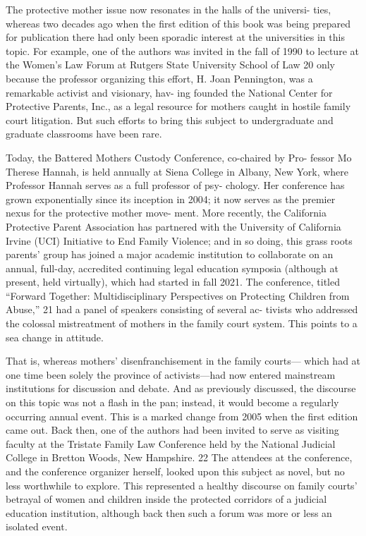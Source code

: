 
The protective mother issue now resonates in the halls of the universi-
ties, whereas two decades ago when the first edition of this book was
being prepared for publication there had only been sporadic interest at
the universities in this topic. For example, one of the authors was invited
in the fall of 1990 to lecture at the Women’s Law Forum at Rutgers State
University School of Law 20 only because the professor organizing this
effort, H. Joan Pennington, was a remarkable activist and visionary, hav-
ing founded the National Center for Protective Parents, Inc., as a legal
resource for mothers caught in hostile family court litigation. But such
efforts to bring this subject to undergraduate and graduate classrooms
have been rare. \pfl{}


Today, the Battered Mothers Custody Conference, co-chaired by Pro-
fessor Mo Therese Hannah, is held annually at Siena College in Albany,
New York, where Professor Hannah serves as a full professor of psy-
chology. Her conference has grown exponentially since its inception in
2004; it now serves as the premier nexus for the protective mother move-
ment. More recently, the California Protective Parent Association has
partnered with the University of California Irvine (UCI) Initiative to
End Family Violence; and in so doing, this grass roots parents’ group
has joined a major academic institution to collaborate on an annual,
full-day, accredited continuing legal education symposia (although at
present, held virtually), which had started in fall 2021. The conference,
titled “Forward Together: Multidisciplinary Perspectives on Protecting
Children from Abuse,” 21 had a panel of speakers consisting of several ac-
tivists who addressed the colossal mistreatment of mothers in the family
court system. This points to a sea change in attitude. \pfl{}


That is, whereas mothers’ disenfranchisement in the family courts—
which had at one time been solely the province of activists—had now
entered mainstream institutions for discussion and debate. And as
previously discussed, the discourse on this topic was not a flash in the
pan; instead, it would become a regularly occurring annual event. This is
a marked change from 2005 when the first edition came out. Back then,
one of the authors had been invited to serve as visiting faculty at the
Tristate Family Law Conference held by the National Judicial College
in Bretton Woods, New Hampshire. 22 The attendees at the conference,
and the conference organizer herself, looked upon this subject as novel,
but no less worthwhile to explore. This represented a healthy discourse
on family courts’ betrayal of women and children inside the protected
corridors of a judicial education institution, although back then such a
forum was more or less an isolated event. \pfl{}



